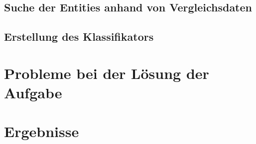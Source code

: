 \documentclass[a4paper]{article}
\begin{document}
\subsection{Suche der Entities anhand von Vergleichsdaten}
\subsection{Erstellung des Klassifikators}

\section{Probleme bei der Lösung der Aufgabe}
\section{Ergebnisse}
\end{document}
